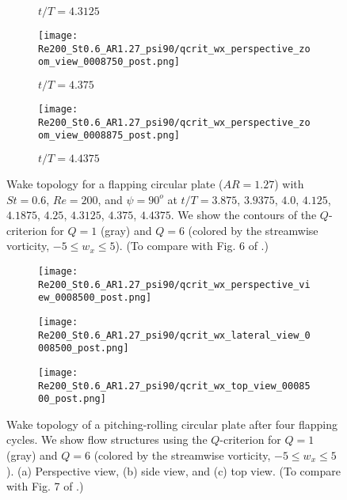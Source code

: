 \begin{figure}[H]
\begin{subfigure}[b]{0.3\textwidth}
    \caption{$t / T = 4.3125$}
    \label{fig:baseline_qcrit_perspective:0008625}
  \end{subfigure}
  \hspace{0.5em}
  \begin{subfigure}[b]{0.3\textwidth}
    \centering
    \texttt{[image: Re200\_St0.6\_AR1.27\_psi90/qcrit\_wx\_perspective\_zoom\_view\_0008750\_post.png]}
    \caption{$t / T = 4.375$}
    \label{fig:baseline_qcrit_perspective:0008750}
  \end{subfigure}
  \hspace{0.5em}
  \begin{subfigure}[b]{0.3\textwidth}
    \centering
    \texttt{[image: Re200\_St0.6\_AR1.27\_psi90/qcrit\_wx\_perspective\_zoom\_view\_0008875\_post.png]}
    \caption{$t / T = 4.4375$}
    \label{fig:baseline_qcrit_perspective:0008875}
  \end{subfigure}
  \caption{Wake topology for a flapping circular plate ($AR = 1.27$) with $St = 0.6$, $Re = 200$, and $\psi = 90^o$ at $t / T = 3.875$, $3.9375$, $4.0$, $4.125$, $4.1875$, $4.25$, $4.3125$, $4.375$, $4.4375$. We show the contours of the $Q$-criterion for $Q = 1$ (gray) and $Q = 6$ (colored by the streamwise vorticity, $-5 \leq w_x \leq 5$). (To compare with Fig. 6 of \citet{li_dong_2016}.)}
  \label{fig:baseline_qcrit_perspective}
\end{figure}

\begin{figure}[H]
  \centering
  \begin{minipage}{0.55\linewidth}
    \begin{subfigure}[t]{\linewidth}
      \texttt{[image: Re200\_St0.6\_AR1.27\_psi90/qcrit\_wx\_perspective\_view\_0008500\_post.png]}
      \caption{}
      \label{fig:baseline_wake_topology:perspective}
    \end{subfigure}
  \end{minipage}
  \begin{minipage}{0.35\linewidth}
    \begin{subfigure}[t]{\linewidth}
      \texttt{[image: Re200\_St0.6\_AR1.27\_psi90/qcrit\_wx\_lateral\_view\_0008500\_post.png]}
      \caption{}
      \label{fig:baseline_wake_topology:lateral}
    \end{subfigure}
    \vspace{1cm}
    \begin{subfigure}[b]{\linewidth}
      \texttt{[image: Re200\_St0.6\_AR1.27\_psi90/qcrit\_wx\_top\_view\_0008500\_post.png]}
      \caption{}
      \label{fig:baseline_wake_topology:top}
    \end{subfigure}
  \end{minipage}
  \caption{Wake topology of a pitching-rolling circular plate after four flapping cycles. We show flow structures  using the $Q$-criterion for $Q = 1$ (gray) and $Q = 6$ (colored by the streamwise vorticity, $-5 \leq w_x \leq 5$). (a) Perspective view, (b) side view, and (c) top view. (To compare with Fig. 7 of \citet{li_dong_2016}.)}
  \label{fig:baseline_wake_topology}
\end{figure}


